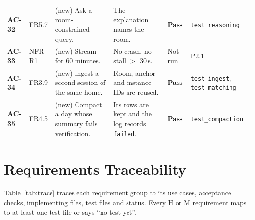 \begin{ltab}
\begin{longtable}{@{}>{\bfseries}L{1.1cm}L{1.6cm}L{3.9cm}L{3.6cm}L{1.6cm}L{2.7cm}@{}}
AC-32 & FR5.7 & (new) Ask a room-constrained query. & The explanation names the room. & \textbf{Pass} & \texttt{test\_reasoning}\\
AC-33 & NFR-R1 & (new) Stream for 60 minutes. & No crash, no stall $>$ 30\,s. & Not run & P2.1\\
AC-34 & FR3.9 & (new) Ingest a second session of the same home. & Room, anchor and instance IDs are reused. & \textbf{Pass} & \texttt{test\_ingest}, \texttt{test\_matching}\\
AC-35 & FR4.5 & (new) Compact a day whose summary fails verification. & Its rows are kept and the log records \texttt{failed}. & \textbf{Pass} & \texttt{test\_compaction}\\
\end{longtable}
\end{ltab}

\section{Requirements Traceability}
Table~\ref{tab:trace} traces each requirement group to its use cases,
acceptance checks, implementing files, test files and status. Every H or M
requirement maps to at least one test file or says ``no test yet''.

